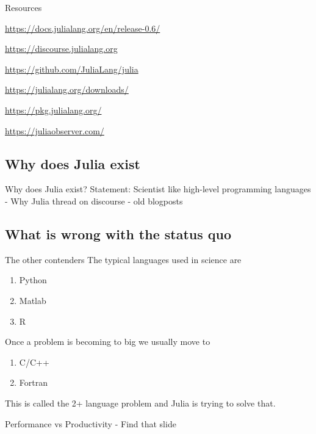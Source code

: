 \documentclass{beamer}
\begin{document}
\begin{frame}{Resources}
  \begin{description}
    \item[Documentation] \url{https://docs.julialang.org/en/release-0.6/}
    \item[Forum] \url{https://discourse.julialang.org}
    \item[Issue Tracker] \url{https://github.com/JuliaLang/julia}
    \item[Downloads] \url{https://julialang.org/downloads/}
    \item[Packages] \url{https://pkg.julialang.org/}
    \item \url{https://juliaobserver.com/}
  \end{description}
\end{frame}

\subsection{Why does Julia exist}
\begin{frame}{Why does Julia exist?}
  Statement: Scientist like high-level programming languages
  - Why Julia thread on discourse
  - old blogposts
\end{frame}
\subsection{What is wrong with the status quo}
\begin{frame}{The other contenders}
  The typical languages used in science are
  \begin{enumerate}
    \item Python
    \item Matlab
    \item R
  \end{enumerate}

  Once a problem is becoming to big we usually move to
  \begin{enumerate}
    \item C/C++
    \item Fortran
  \end{enumerate}
  This is called the 2+ language problem and Julia is trying to solve that.
\end{frame}

\begin{frame}{Performance vs Productivity}
  - Find that slide
\end{frame}
\end{document}
